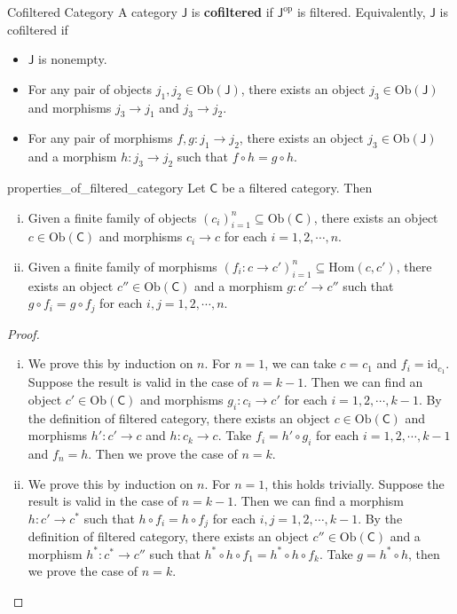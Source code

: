 \begin{definition}{Cofiltered Category}{}
    A category $\mathsf{J}$ is \textbf{cofiltered} if $\mathsf{J}^{\mathrm{op}}$ is filtered. Equivalently, $\mathsf{J}$ is cofiltered if
    \begin{itemize}
        \item $\mathsf{J}$ is nonempty.
        \item For any pair of objects $j_1,j_2\in \mathrm{Ob}(\mathsf{J})$, there exists an object $j_3\in \mathrm{Ob}(\mathsf{J})$ and morphisms $j_3\to j_1$ and $j_3\to j_2$.
        \item For any pair of morphisms $f,g:j_1\to j_2$, there exists an object $j_3\in \mathrm{Ob}(\mathsf{J})$ and a morphism $h:j_3\to j_2$ such that $f\circ h=g\circ h$.
    \end{itemize}
\end{definition}

\begin{lemma}{}{properties_of_filtered_category}
    Let $\mathsf{C}$ be a filtered category. Then 
    \begin{enumerate}[(i)]
        \item Given a finite family of objects $\left(c_i\right)_{i=1}^n\subseteq \mathrm{Ob}(\mathsf{C})$, there exists an object $c\in \mathrm{Ob}(\mathsf{C})$ and morphisms $c_i\to c$ for each $i=1,2,\cdots,n$.
        \item Given a finite family of morphisms $\left(f_i:c\to c'\right)_{i=1}^n\subseteq \mathrm{Hom}(c,c')$, there exists an object $c''\in \mathrm{Ob}(\mathsf{C})$ and a morphism $g:c'\to c''$ such that $g\circ f_i=g\circ f_j$ for each $i,j=1,2,\cdots,n$.
    \end{enumerate}
\end{lemma}
\begin{proof}
    \begin{enumerate}[(i)]
        \item We prove this by induction on $n$. For $n=1$, we can take $c=c_1$ and $f_i=\mathrm{id}_{c_1}$. Suppose the result is valid in the case of $n=k-1$. Then we can find an object $c'\in \mathrm{Ob}(\mathsf{C})$ and morphisms $g_i:c_i\to c'$ for each $i=1,2,\cdots,k-1$. By the definition of filtered category, there exists an object $c\in \mathrm{Ob}(\mathsf{C})$ and morphisms $h':c'\to c$ and $h:c_k\to c$. Take $f_i=h'\circ g_i$ for each $i=1,2,\cdots,k-1$ and $f_n=h$. Then we prove the case of $n=k$.
        \item We prove this by induction on $n$. For $n=1$, this holds trivially. Suppose the result is valid in the case of $n=k-1$. Then we can find a morphism $h:c'\to c^*$ such that $h\circ f_i=h\circ f_j$ for each $i,j=1,2,\cdots,k-1$. By the definition of filtered category, there exists an object $c''\in \mathrm{Ob}(\mathsf{C})$ and a morphism $h^*:c^*\to c''$ such that $h^*\circ h\circ f_1=h^*\circ h\circ f_k$. Take $g=h^*\circ h$, then we prove the case of $n=k$.
    \end{enumerate}
\end{proof}

